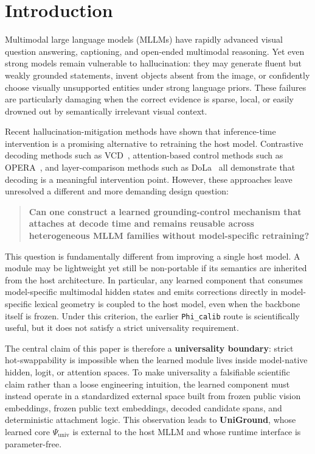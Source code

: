 \section{Introduction}
\label{sec:intro}

Multimodal large language models (MLLMs) have rapidly advanced visual question answering, captioning, and open-ended multimodal reasoning. Yet even strong models remain vulnerable to hallucination: they may generate fluent but weakly grounded statements, invent objects absent from the image, or confidently choose visually unsupported entities under strong language priors. These failures are particularly damaging when the correct evidence is sparse, local, or easily drowned out by semantically irrelevant visual context.

Recent hallucination-mitigation methods have shown that inference-time intervention is a promising alternative to retraining the host model. Contrastive decoding methods such as VCD~\cite{leng2024vcd}, attention-based control methods such as OPERA~\cite{huang2024opera}, and layer-comparison methods such as DoLa~\cite{chuang2024dola} all demonstrate that decoding is a meaningful intervention point. However, these approaches leave unresolved a different and more demanding design question:

\begin{quote}
\textbf{Can one construct a learned grounding-control mechanism that attaches at decode time and remains reusable across heterogeneous MLLM families without model-specific retraining?}
\end{quote}

This question is fundamentally different from improving a single host model. A module may be lightweight yet still be non-portable if its semantics are inherited from the host architecture. In particular, any learned component that consumes model-specific multimodal hidden states and emits corrections directly in model-specific lexical geometry is coupled to the host model, even when the backbone itself is frozen. Under this criterion, the earlier \texttt{Phi\_calib} route is scientifically useful, but it does not satisfy a strict universality requirement.

The central claim of this paper is therefore a \textbf{universality boundary}: strict hot-swappability is impossible when the learned module lives inside model-native hidden, logit, or attention spaces. To make universality a falsifiable scientific claim rather than a loose engineering intuition, the learned component must instead operate in a standardized external space built from frozen public vision embeddings, frozen public text embeddings, decoded candidate spans, and deterministic attachment logic. This observation leads to \textbf{UniGround}, whose learned core $\Psi_{\mathrm{univ}}$ is external to the host MLLM and whose runtime interface is parameter-free.

